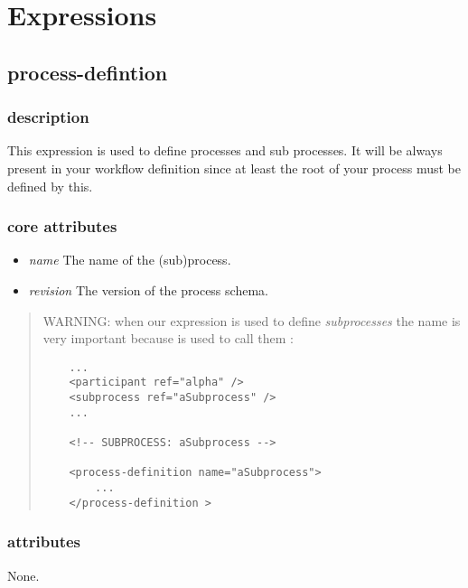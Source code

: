 
\chapter{Expressions}



\section{process-defintion}

\subsection{description}

This expression is used to define processes and sub processes. It will be always present
in your workflow definition since at least the root of your process must be defined
by this. 


\subsection{core attributes}

\begin{itemize}
 
 \item \textit{name} The name of the (sub)process.
 \item \textit{revision} The version of the process schema.


\end{itemize}

\begin{quote}
    WARNING: when our expression is used to define \emph{subprocesses} the 
    name is very important because is used to call them :

    \begin{verbatim}
    ...
    <participant ref="alpha" /> 
    <subprocess ref="aSubprocess" />
    ...

    <!-- SUBPROCESS: aSubprocess -->

    <process-definition name="aSubprocess">
        ...
    </process-definition >
    \end{verbatim}
\end{quote}

    \subsection{attributes}

None.

